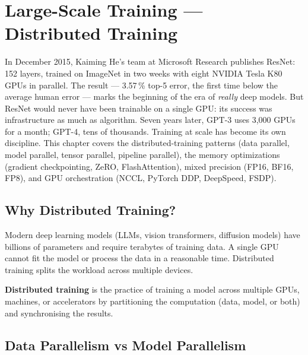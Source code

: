 \chapter{Large-Scale Training --- Distributed Training}
\label{ch:training}

In December 2015, Kaiming He's team at Microsoft Research publishes ResNet: 152 layers, trained on ImageNet in two weeks with eight NVIDIA Tesla K80 GPUs in parallel. The result --- 3.57\,\% top-5 error, the first time below the average human error --- marks the beginning of the era of \emph{really} deep models. But ResNet would never have been trainable on a single GPU: its success was infrastructure as much as algorithm. Seven years later, GPT-3 uses 3{,}000 GPUs for a month; GPT-4, tens of thousands. Training at scale has become its own discipline. This chapter covers the distributed-training patterns (data parallel, model parallel, tensor parallel, pipeline parallel), the memory optimizations (gradient checkpointing, ZeRO, FlashAttention), mixed precision (FP16, BF16, FP8), and GPU orchestration (NCCL, PyTorch DDP, DeepSpeed, FSDP).

\section{Why Distributed Training?}
\label{sec:why-distributed}

Modern deep learning models (LLMs, vision transformers, diffusion models)
have billions of parameters and require terabytes of training data.
A single GPU cannot fit the model or process the data in a reasonable time.
Distributed training splits the workload across multiple devices.

\begin{definition}
\textbf{Distributed training} is the practice
of training a model across multiple GPUs, machines, or accelerators by
partitioning the computation (data, model, or both) and synchronising
the results.
\end{definition}

\section{Data Parallelism vs Model Parallelism}
\label{sec:parallelism-types}

